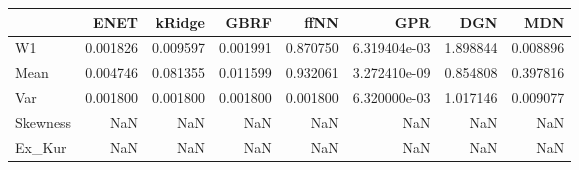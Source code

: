 \begin{tabular}{lrrrrrrr}
\toprule
{} &      ENET &    kRidge &      GBRF &      ffNN &           GPR &       DGN &       MDN \\
\midrule
W1       &  0.001826 &  0.009597 &  0.001991 &  0.870750 &  6.319404e-03 &  1.898844 &  0.008896 \\
Mean     &  0.004746 &  0.081355 &  0.011599 &  0.932061 &  3.272410e-09 &  0.854808 &  0.397816 \\
Var      &  0.001800 &  0.001800 &  0.001800 &  0.001800 &  6.320000e-03 &  1.017146 &  0.009077 \\
Skewness &       NaN &       NaN &       NaN &       NaN &           NaN &       NaN &       NaN \\
Ex\_Kur   &       NaN &       NaN &       NaN &       NaN &           NaN &       NaN &       NaN \\
\bottomrule
\end{tabular}
